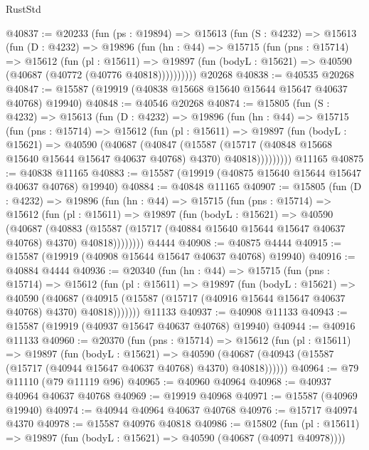 \begin{lexlean}{RustStd}
\begin{coremodule}
@40837 := @20233
    (fun (ps : @19894) =>
    @15613
      (fun (S : @4232) =>
      @15613
        (fun (D : @4232) =>
        @19896
          (fun (hn : @44) =>
          @15715
            (fun (pns : @15714) =>
            @15612
              (fun (pl : @15611) =>
              @19897 (fun (bodyL : @15621) => @40590 (@40687 (@40772 (@40776 @40818))))))))))
    @20268
@40838 := @40535 @20268
@40847 := @15587 (@19919 (@40838 @15668 @15640 @15644 @15647 @40637 @40768) @19940)
@40848 := @40546 @20268
@40874 := @15805
    (fun (S : @4232) =>
    @15613
      (fun (D : @4232) =>
      @19896
        (fun (hn : @44) =>
        @15715
          (fun (pns : @15714) =>
          @15612
            (fun (pl : @15611) =>
            @19897
              (fun (bodyL : @15621) =>
              @40590
                (@40687
                  (@40847
                    (@15587
                      (@15717 (@40848 @15668 @15640 @15644 @15647 @40637 @40768) @4370)
                      @40818)))))))))
    @11165
@40875 := @40838 @11165
@40883 := @15587 (@19919 (@40875 @15640 @15644 @15647 @40637 @40768) @19940)
@40884 := @40848 @11165
@40907 := @15805
    (fun (D : @4232) =>
    @19896
      (fun (hn : @44) =>
      @15715
        (fun (pns : @15714) =>
        @15612
          (fun (pl : @15611) =>
          @19897
            (fun (bodyL : @15621) =>
            @40590
              (@40687
                (@40883
                  (@15587 (@15717 (@40884 @15640 @15644 @15647 @40637 @40768) @4370) @40818))))))))
    @4444
@40908 := @40875 @4444
@40915 := @15587 (@19919 (@40908 @15644 @15647 @40637 @40768) @19940)
@40916 := @40884 @4444
@40936 := @20340
    (fun (hn : @44) =>
    @15715
      (fun (pns : @15714) =>
      @15612
        (fun (pl : @15611) =>
        @19897
          (fun (bodyL : @15621) =>
          @40590
            (@40687
              (@40915 (@15587 (@15717 (@40916 @15644 @15647 @40637 @40768) @4370) @40818)))))))
    @11133
@40937 := @40908 @11133
@40943 := @15587 (@19919 (@40937 @15647 @40637 @40768) @19940)
@40944 := @40916 @11133
@40960 := @20370
    (fun (pns : @15714) =>
    @15612
      (fun (pl : @15611) =>
      @19897
        (fun (bodyL : @15621) =>
        @40590 (@40687 (@40943 (@15587 (@15717 (@40944 @15647 @40637 @40768) @4370) @40818))))))
@40964 := @79 @11110 (@79 @11119 @96)
@40965 := @40960 @40964
@40968 := @40937 @40964 @40637 @40768
@40969 := @19919 @40968
@40971 := @15587 (@40969 @19940)
@40974 := @40944 @40964 @40637 @40768
@40976 := @15717 @40974 @4370
@40978 := @15587 @40976 @40818
@40986 := @15802
    (fun (pl : @15611) => @19897 (fun (bodyL : @15621) => @40590 (@40687 (@40971 @40978))))

\end{coremodule}
\end{lexlean}

